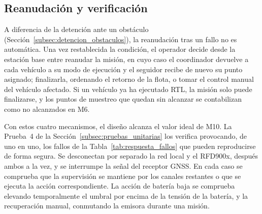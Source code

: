 \subsection{Reanudación y verificación}
\label{subsec:reanudacion_fallos}

A diferencia de la detención ante un obstáculo (Sección~\ref{subsec:detencion_obstaculos}), la reanudación tras un fallo no es automática. Una vez restablecida la condición, el operador decide desde la estación base entre reanudar la misión, en cuyo caso el coordinador devuelve a cada vehículo a su modo de ejecución y el seguidor recibe de nuevo su punto asignado; finalizarla, ordenando el retorno de la flota, o tomar el control manual del vehículo afectado. Si un vehículo ya ha ejecutado RTL, la misión solo puede finalizarse, y los puntos de muestreo que quedan sin alcanzar se contabilizan como no alcanzados en M6.

Con estos cuatro mecanismos, el diseño alcanza el valor ideal de M10. La Prueba~4 de la Sección~\ref{subsec:pruebas_unitarias} los verifica provocando, de uno en uno, los fallos de la Tabla~\ref{tab:respuesta_fallos} que pueden reproducirse de forma segura. Se desconectan por separado la red local y el RFD900x, después ambos a la vez, y se interrumpe la señal del receptor GNSS. En cada caso se comprueba que la supervisión se mantiene por los canales restantes o que se ejecuta la acción correspondiente. La acción de batería baja se comprueba elevando temporalmente el umbral por encima de la tensión de la batería, y la recuperación manual, conmutando la emisora durante una misión. %